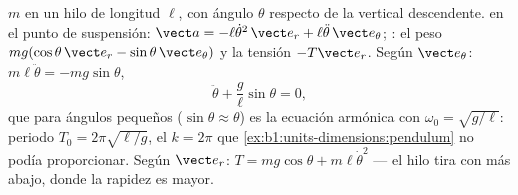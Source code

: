 \begin{example}\label{ex:b1:newton-dynamics:pendulum}
 $m$ en un hilo de longitud $\ell$, con ángulo $\theta$ respecto de la
vertical descendente.  en el punto de suspensión: $\vect a =
-\ell\dot\theta^2\,\vect e_r + \ell\ddot\theta\,\vect e_\theta$; :
el peso $mg(\cos\theta\,\vect e_r - \sin\theta\,\vect e_\theta)$ y la
tensión $-T\vect e_r$. Según $\vect e_\theta$: $m\ell\ddot\theta =
-mg\sin\theta$,
\[
\ddot\theta + \frac{g}{\ell}\sin\theta = 0 ,
\]
que para ángulos pequeños ($\sin\theta \approx \theta$) es la ecuación
armónica con $\omega_0 = \sqrt{g/\ell}$: periodo $T_0 = 2\pi\sqrt{\ell/g}$,
el $k = 2\pi$ que \cref{ex:b1:units-dimensions:pendulum} no podía
proporcionar. Según $\vect e_r$: $T = mg\cos\theta + m\ell\dot\theta^2$ ---
el hilo tira con más  abajo, donde la rapidez es mayor.
\end{example}

